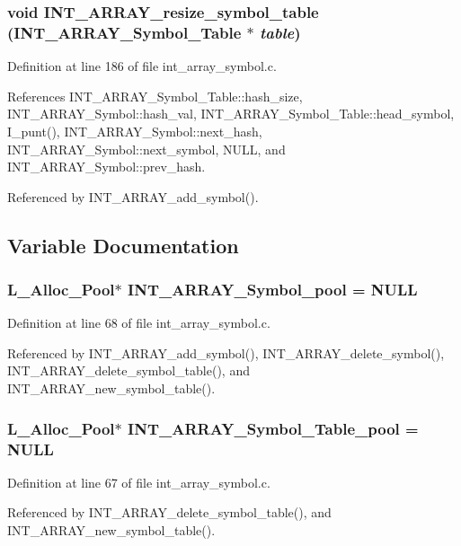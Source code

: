 \subsubsection{\setlength{\rightskip}{0pt plus 5cm}void INT\_\-ARRAY\_\-resize\_\-symbol\_\-table (\bf{INT\_\-ARRAY\_\-Symbol\_\-Table} $\ast$ {\em table})}\label{int__array__symbol_8c_4b706c26dac3f6b43e8e94f196a90058}




Definition at line 186 of file int\_\-array\_\-symbol.c.

References INT\_\-ARRAY\_\-Symbol\_\-Table::hash\_\-size, INT\_\-ARRAY\_\-Symbol::hash\_\-val, INT\_\-ARRAY\_\-Symbol\_\-Table::head\_\-symbol, I\_\-punt(), INT\_\-ARRAY\_\-Symbol::next\_\-hash, INT\_\-ARRAY\_\-Symbol::next\_\-symbol, NULL, and INT\_\-ARRAY\_\-Symbol::prev\_\-hash.

Referenced by INT\_\-ARRAY\_\-add\_\-symbol().

\subsection{Variable Documentation}
\subsubsection{\setlength{\rightskip}{0pt plus 5cm}\bf{L\_\-Alloc\_\-Pool}$\ast$ \bf{INT\_\-ARRAY\_\-Symbol\_\-pool} = NULL}\label{int__array__symbol_8c_868668f566b64bc57ceefd827a7a0be1}




Definition at line 68 of file int\_\-array\_\-symbol.c.

Referenced by INT\_\-ARRAY\_\-add\_\-symbol(), INT\_\-ARRAY\_\-delete\_\-symbol(), INT\_\-ARRAY\_\-delete\_\-symbol\_\-table(), and INT\_\-ARRAY\_\-new\_\-symbol\_\-table().
\subsubsection{\setlength{\rightskip}{0pt plus 5cm}\bf{L\_\-Alloc\_\-Pool}$\ast$ \bf{INT\_\-ARRAY\_\-Symbol\_\-Table\_\-pool} = NULL}\label{int__array__symbol_8c_f4b7be3f68856b5b058ae160873a0fcc}




Definition at line 67 of file int\_\-array\_\-symbol.c.

Referenced by INT\_\-ARRAY\_\-delete\_\-symbol\_\-table(), and INT\_\-ARRAY\_\-new\_\-symbol\_\-table().